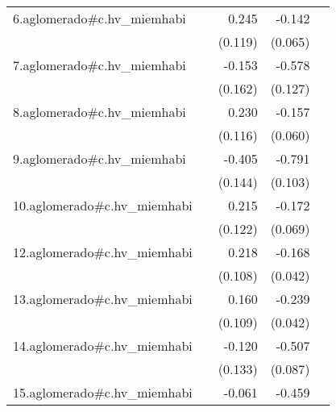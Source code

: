 {\begin{longtable}{l*{4}{D{.}{.}{-1}}}
\addlinespace
6.aglomerado#c.hv\_miemhabi&                     &       0.245\sym{*}  &      -0.142\sym{*}  &                     \\
            &                     &     (0.119)         &     (0.065)         &                     \\
\addlinespace
7.aglomerado#c.hv\_miemhabi&                     &      -0.153         &      -0.578\sym{***}&                     \\
            &                     &     (0.162)         &     (0.127)         &                     \\
\addlinespace
8.aglomerado#c.hv\_miemhabi&                     &       0.230\sym{*}  &      -0.157\sym{**} &                     \\
            &                     &     (0.116)         &     (0.060)         &                     \\
\addlinespace
9.aglomerado#c.hv\_miemhabi&                     &      -0.405\sym{**} &      -0.791\sym{***}&                     \\
            &                     &     (0.144)         &     (0.103)         &                     \\
\addlinespace
10.aglomerado#c.hv\_miemhabi&                     &       0.215         &      -0.172\sym{*}  &                     \\
            &                     &     (0.122)         &     (0.069)         &                     \\
\addlinespace
12.aglomerado#c.hv\_miemhabi&                     &       0.218\sym{*}  &      -0.168\sym{***}&                     \\
            &                     &     (0.108)         &     (0.042)         &                     \\
\addlinespace
13.aglomerado#c.hv\_miemhabi&                     &       0.160         &      -0.239\sym{***}&                     \\
            &                     &     (0.109)         &     (0.042)         &                     \\
\addlinespace
14.aglomerado#c.hv\_miemhabi&                     &      -0.120         &      -0.507\sym{***}&                     \\
            &                     &     (0.133)         &     (0.087)         &                     \\
\addlinespace
15.aglomerado#c.hv\_miemhabi&                     &      -0.061         &      -0.459\sym{***}&                     \\

\end{longtable}}
